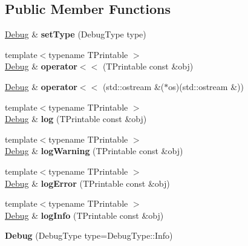 \subsection*{Public Member Functions}
\begin{DoxyCompactItemize}
\item 
\mbox{\label{classts_1_1common_1_1_debug_a3440dbc6be1c1b605aff36c9b1d133e0}} 
\hyperlink{classts_1_1common_1_1_debug}{Debug} \& {\bfseries set\+Type} (Debug\+Type type)
\item 
\mbox{\label{classts_1_1common_1_1_debug_a82b2c8f2b6590845c22c83964d04a026}} 
{\footnotesize template$<$typename T\+Printable $>$ }\\\hyperlink{classts_1_1common_1_1_debug}{Debug} \& {\bfseries operator$<$$<$} (T\+Printable const \&obj)
\item 
\mbox{\label{classts_1_1common_1_1_debug_ab30af1d3317a1a32622c8486f0df8161}} 
\hyperlink{classts_1_1common_1_1_debug}{Debug} \& {\bfseries operator$<$$<$} (std\+::ostream \&($\ast$os)(std\+::ostream \&))
\item 
\mbox{\label{classts_1_1common_1_1_debug_a4113c8aa9bf0ebac5951a76dfb889ef5}} 
{\footnotesize template$<$typename T\+Printable $>$ }\\\hyperlink{classts_1_1common_1_1_debug}{Debug} \& {\bfseries log} (T\+Printable const \&obj)
\item 
\mbox{\label{classts_1_1common_1_1_debug_aee4b0a4f8a2506f4af92c75bdf4746be}} 
{\footnotesize template$<$typename T\+Printable $>$ }\\\hyperlink{classts_1_1common_1_1_debug}{Debug} \& {\bfseries log\+Warning} (T\+Printable const \&obj)
\item 
\mbox{\label{classts_1_1common_1_1_debug_aefed563c3c179667062316a65f219f70}} 
{\footnotesize template$<$typename T\+Printable $>$ }\\\hyperlink{classts_1_1common_1_1_debug}{Debug} \& {\bfseries log\+Error} (T\+Printable const \&obj)
\item 
\mbox{\label{classts_1_1common_1_1_debug_a1ce25fbe36ab47b629232d8131094b81}} 
{\footnotesize template$<$typename T\+Printable $>$ }\\\hyperlink{classts_1_1common_1_1_debug}{Debug} \& {\bfseries log\+Info} (T\+Printable const \&obj)
\item 
\mbox{\label{classts_1_1common_1_1_debug_aac74d0240ee7ae82b54dd4d3657c7414}} 
{\bfseries Debug} (Debug\+Type type=Debug\+Type\+::\+Info)
\end{DoxyCompactItemize}

